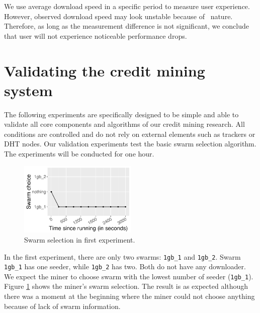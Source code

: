 We use average download speed in a specific period to measure user experience. However, observed download speed may look unstable because of \bt~nature. Therefore, as long as the measurement difference is not significant, we conclude that user will not experience noticeable performance drops. 


\section{Validating the credit mining system}
\label{section:cmsvalidation}
The following experiments are specifically designed to be simple and able to validate all core components and algorithms of our credit mining research. All conditions are controlled and do not rely on external elements such as trackers or DHT nodes. Our validation experiments test the basic swarm selection algorithm. The experiments will be conducted for one hour.

\begin{figure}[h]
	\centering
	\includegraphics[width=0.5\textwidth]{pics/results/val0.pdf}
	\caption{Swarm selection in first experiment.}
	\label{fig:val0}
\end{figure}

In the first experiment, there are only two swarms: \texttt{1gb\_1} and \texttt{1gb\_2}. Swarm \texttt{1gb\_1} has one seeder, while \texttt{1gb\_2} has two. Both do not have any downloader. We expect the miner to choose swarm with the lowest number of seeder (\texttt{1gb\_1}). Figure \ref{fig:val0} shows the miner's swarm selection. The result is as expected although there was a moment at the beginning where the miner could not choose anything because of lack of swarm information.


